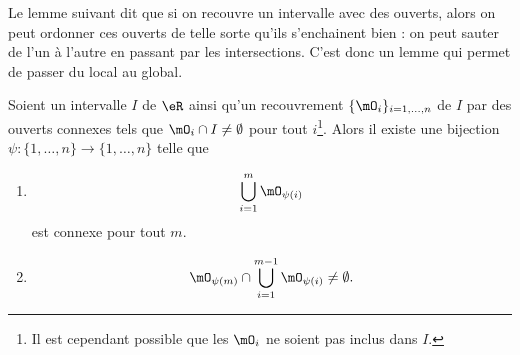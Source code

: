 Le lemme suivant dit que si on recouvre un intervalle avec des ouverts, alors on peut ordonner ces ouverts de telle sorte qu'ils s'enchainent bien : on peut sauter de l'un à l'autre en passant par les intersections. C'est donc un lemme qui permet de passer du local au global.

\begin{lemma}       \label{LEMooNMGWooTfQDeO}
	Soient un intervalle \( I\) de \( \eR\) ainsi qu'un recouvrement \( \{ \mO_i \}_{i=1,\ldots, n}\) de \( I\) par des ouverts connexes tels que \( \mO_i\cap I\neq\emptyset\) pour tout \( i\)\footnote{Il est cependant possible que les \( \mO_i\) ne soient pas inclus dans \( I\).}. Alors il existe une bijection \( \psi\colon \{ 1,\ldots, n \}\to \{ 1,\ldots, n \}\) telle que
	\begin{enumerate}
		\item
		      \begin{equation}
			      \bigcup_{i=1}^m\mO_{\psi(i)}
		      \end{equation}
		      est connexe pour tout \( m\).
		\item
		      \begin{equation}
			      \mO_{\psi(m)}\cap\bigcup_{i=1}^{m-1}\mO_{\psi(i)}\neq \emptyset.
		      \end{equation}
	\end{enumerate}
\end{lemma}


